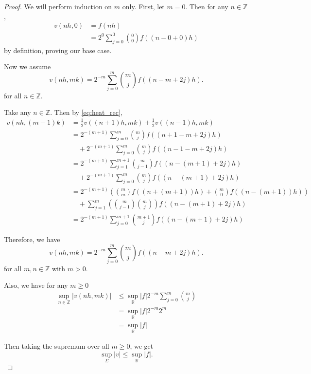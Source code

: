 \documentclass[a4paper]{article}
\newcommand{\R}{\mathbb{R}}
\newcommand{\Z}{\mathbb{Z}}
\begin{document}
\begin{enumerate}
\begin{proof}
      We will perform induction on $m$ only. First, let $m=0$. Then for any $n \in \Z$,
      \begin{align*}
        v(nh,0) &= f(nh) \\
        &= 2^{0} \sum_{j=0}^0 \binom{0}{0} f( (n - 0 + 0)h)
      \end{align*}
      by definition, proving our base case.

      Now we assume
      \[ v(nh, mk) = 2^{-m} \sum_{j=0}^m \binom{m}{j} f \left( (n - m + 2j)h \right) .\]
      for all $n \in \Z$.

      Take any $n \in \Z$. Then by \eqref{eq:heat_rec},
      \begin{align*}
        v(nh, (m+1)k) &= \frac{1}{2} v( (n+1)h, mk) + \frac{1}{2} v( (n-1)h, mk) \\
        &= 2^{-(m+1)} \sum_{j=0}^m \binom{m}{j} f( (n+1-m+2j)h) \\
        &\quad + 2^{-(m+1)} \sum_{j=0}^m \binom{m}{j} f( (n-1-m+2j)h) \\
        &= 2^{-(m+1)} \sum_{j=1}^{m+1} \binom{m}{j-1} f( (n-(m+1)+2j)h) \\
        &\quad + 2^{-(m+1)} \sum_{j=0}^m \binom{m}{j} f( (n-(m+1)+2j)h) \\
        &= 2^{-(m+1)} \left( \binom{m}{m} f( (n + (m+1) )h) + \binom{m}{0} f( (n - (m+1))h) \right) \\
        &\quad + \sum_{j=1}^m \left( \binom{m}{j-1} \binom{m}{j} \right) f( (n-(m+1)+2j)h) \\
        &= 2^{-(m+1)} \sum_{j=0}^{m+1} \binom{m+1}{j} f( (n-(m+1)+2j)h)
      \end{align*}

      Therefore, we have
      \[ v(nh, mk) = 2^{-m} \sum_{j=0}^m \binom{m}{j} f \left( (n - m + 2j)h \right) .\]
      for all $m,n \in \Z$ with $m>0$.

      Also, we have for any $m\geq 0$
      \begin{align*}
        \sup_{n \in \Z} |v(nh,mk)| &\leq \sup_\R |f| 2^{-m} \sum_{j=0}^m \binom{m}{j} \\
        &= \sup_\R |f| 2^{-m} 2^m \\
        &= \sup_\R |f|
      \end{align*}

      Then taking the supremum over all $m \geq 0$, we get
      \[ \sup_{\Sigma} |v| \leq \sup_{\R} |f| .\]

    \end{proof}


\end{enumerate}
\end{document}
